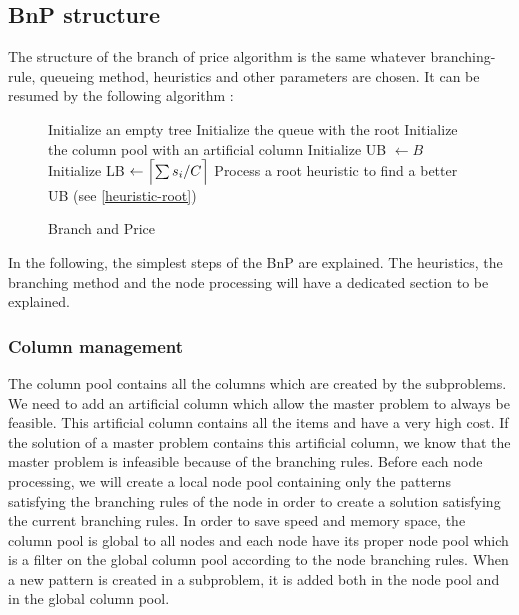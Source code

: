 \subsection{BnP structure}

The structure of the branch of price algorithm is the same whatever branching-rule, queueing method, heuristics and other parameters are chosen. It can be resumed by the following algorithm :

\begin{figure}[!ht]
	\centering
	\begin{minipage}{0.8\linewidth}
		\begin{algorithm}[H]
			\DontPrintSemicolon 
			\SetAlgoLined
			Initialize an empty tree\;
			Initialize the queue with the root\;
			Initialize the column pool with an artificial column\;
			Initialize UB $\leftarrow B$\;
			Initialize LB $\leftarrow \ceil[\Big]{\sum s_i/C}$\;
			Process a root heuristic to find a better UB (see \ref{heuristic-root})\;
			\caption{Branch and Price}
		\end{algorithm}
	\end{minipage}
\end{figure}
\noindent In the following, the simplest steps of the BnP are explained. The heuristics, the branching method and the node processing will have a dedicated section to be explained.

\subsubsection{Column management}

The column pool contains all the columns which are created by the subproblems. We need to add an artificial column which allow the master problem to always be feasible. This artificial column contains all the items and have a very high cost. If the solution of a master problem contains this artificial column, we know that the master problem is infeasible because of the branching rules. Before each node processing, we will create a local node pool containing only the patterns satisfying the branching rules of the node in order to create a solution satisfying the current branching rules. In order to save speed and memory space, the column pool is global to all nodes and each node have its proper node pool which is a filter on the global column pool according to the node branching rules. When a new pattern is created in a subproblem, it is added both in the node pool and in the global column pool. 

